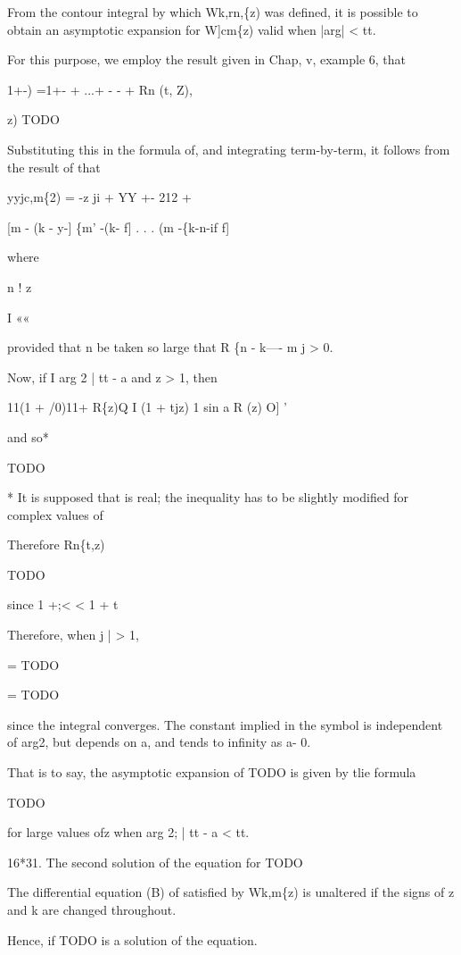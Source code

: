 From the contour integral by which Wk,rn,\{z) was defined, it is
possible to obtain an asymptotic expansion for W]cm\{z) valid when
|arg| < tt.

For this purpose, we employ the result given in Chap, v, example 6,
that

1+-) =1+- + ...+ - - + Rn (t, Z),

z) TODO

Substituting this in the formula of, and integrating
term-by-term, it follows from the result of that

yyjc,m\{2) =  -z ji + YY +- 212 + 

[m - (k - y-] \{m' -(k- f] . . . (m -\{k-n-if f]

where

n ! z

I ««

provided that n be taken so large that R \{n - k---- m j > 0.

Now, if I arg 2 |  tt - a and z > 1, then

11(1 + /0)11+ R\{z)Q I (1 + tjz) 1  sin a R (z)  O] '

and so*

TODO

* It is supposed that is real; the inequality has to be slightly
modified for complex values of

%
%

Therefore Rn\{t,z)

TODO

since 1 +;< < 1 + t

Therefore, when j  | > 1,

= TODO

= TODO

since the integral converges. The constant implied in the symbol is
independent of arg2, but depends on a, and tends to infinity as a-
0.

That is to say, the asymptotic expansion of TODO is given by tlie
formula

TODO

for large values ofz when arg 2; |  tt - a < tt.

16*31. The second solution of the equation for TODO

The differential equation (B) of satisfied by Wk,m\{z) is
unaltered if the signs of z and k are changed throughout.

Hence, if TODO is a solution of the equation.

